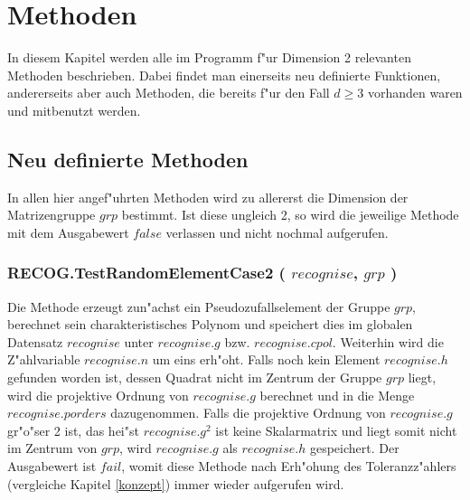 \documentclass[a4paper,11pt]{article}
\theoremstyle{bla}
\begin{document}

\section{Methoden}\label{methoden}

In diesem Kapitel werden alle im Programm f"ur Dimension 2 relevanten Methoden beschrieben. Dabei findet man einerseits neu definierte Funktionen, andererseits aber auch Methoden, die bereits f"ur den Fall $d\geq 3$ vorhanden waren und mitbenutzt werden.


\subsection{Neu definierte Methoden}

In allen hier angef"uhrten Methoden wird zu allererst die Dimension der Matrizengruppe $grp$ bestimmt. Ist diese ungleich 2, so wird die jeweilige Methode mit dem Ausgabewert $false$ verlassen und nicht nochmal aufgerufen.


\subsubsection{RECOG.TestRandomElementCase2 ( $recognise$, $grp$ )}\label{test}

Die Methode erzeugt zun"achst ein Pseudozufallselement der Gruppe $grp$, berechnet sein charakteristisches Polynom und speichert dies im globalen Datensatz $recognise$ unter $recognise.g$ bzw. $recognise.cpol$. Weiterhin wird die Z"ahlvariable $recognise.n$ um eins erh"oht. Falls noch kein Element $recognise.h$ gefunden worden ist, dessen Quadrat nicht im Zentrum der Gruppe $grp$ liegt, wird die projektive Ordnung von $recognise.g$ berechnet und in die Menge $recognise.porders$ dazugenommen. Falls die projektive Ordnung von $recognise.g$ gr"o"ser 2 ist, das hei"st $recognise.g^2$ ist keine Skalarmatrix und liegt somit nicht im Zentrum von $grp$, wird $recognise.g$ als $recognise.h$ gespeichert.
Der Ausgabewert ist $fail$, womit diese Methode nach Erh"ohung des Toleranzz"ahlers (vergleiche Kapitel \ref{konzept}) immer wieder aufgerufen wird.
\end{document}
